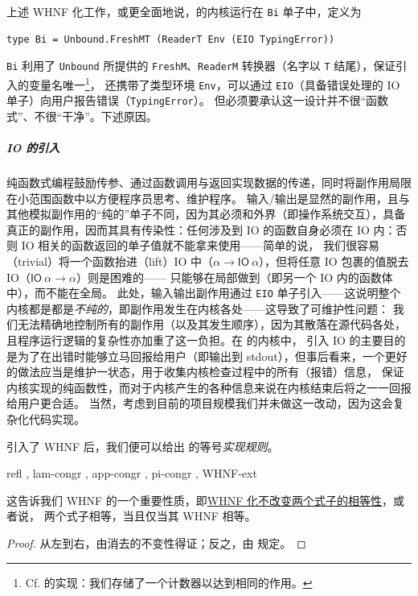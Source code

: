 上述 WHNF 化工作，或更全面地说，\Tigrisd 的内核运行在 \texttt{Bi} 单子中，定义为
\begin{verbatim}
type Bi = Unbound.FreshMT (ReaderT Env (EIO TypingError))
\end{verbatim}
\texttt{Bi} 利用了 \texttt{Unbound} 所提供的 \texttt{FreshM}、\texttt{ReaderM} 转换器（名字以 \texttt{T} 结尾），保证引入的变量名唯一\footnote{
  Cf. \Tigris 的实现：我们存储了一个计数器以达到相同的作用。
}，
还携带了类型环境 \texttt{Env}，可以通过 \texttt{EIO}（具备错误处理的 IO 单子）向用户报告错误（\texttt{TypingError}）。
但必须要承认这一设计并不很“函数式”、不很“干净”。下述原因。

\subparagraph{IO 的引入} 纯函数式编程鼓励传参、通过函数调用与返回实现数据的传递，同时将副作用局限在小范围函数中以方便程序员思考、维护程序。
输入/输出是显然的副作用，且与其他模拟副作用的“纯的”单子不同，因为其必须和外界（即操作系统交互），具备真正的副作用，因而其具有传染性：任何涉及到
IO 的函数自身必须在 IO 内：否则 IO 相关的函数返回的单子值就不能拿来使用——简单的说，
我们很容易（trivial）将一个函数抬进（lift）IO 中（$\alpha\to \mathsf{IO}\ \alpha$），但将任意 IO 包裹的值脱去 IO（$\mathsf{IO}\ \alpha\to\alpha$）则是困难的——
只能够在局部做到（即另一个 IO 内的函数体中），而不能在全局。
此处，输入输出副作用通过 \texttt{EIO} 单子引入——这说明整个内核都是都是\emph{不纯的}，即副作用发生在内核各处——这导致了可维护性问题：
我们无法精确地控制所有的副作用（以及其发生顺序），因为其散落在源代码各处，且程序运行逻辑的复杂性亦加重了这一负担。在 \Tigrisd 的内核中，
引入 IO 的主要目的是为了在出错时能够立马回报给用户（即输出到 stdout），但事后看来，一个更好的做法应当是维护一状态，用于收集内核检查过程中的所有（报错）信息，
保证内核实现的纯函数性，而对于内核产生的各种信息来说在内核结束后将之一一回报给用户更合适。
当然，考虑到目前的项目规模我们并未做这一改动，因为这会复杂化代码实现。

引入了 WHNF 后，我们便可以给出 \Tigrisd 的等号\emph{实现规则}。

{ refl
  , lam-congr
  , app-congr
  , pi-congr
, WHNF-ext}

这告诉我们 WHNF 的一个重要性质，即\underline{WHNF 化不改变两个式子的相等性}，或者说，
两个式子相等，当且仅当其 WHNF 相等。

\begin{proof}
  从左到右，由消去的不变性得证；反之，由  规定。
\end{proof}


